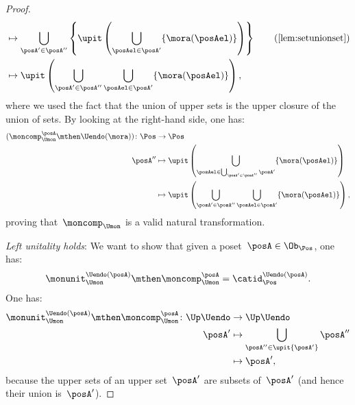 \begin{proof}
\begin{equation}
\begin{aligned}
			                                                                & \mapsto   \bigcup_{\posA'\in \posA''} \left\{ \upit \left( \bigcup_{\posAel \in \posA'} \{ \mora(\posAel)\}\right)\right\} \quad \quad (\text{\cref{lem:setunionset}})                           \\
			                                                                & \mapsto   \upit \left(\bigcup_{\posA'\in \posA''}  \bigcup_{\posAel \in \posA'} \{ \mora(\posAel)\}\right),
		\end{aligned}
	\end{equation}
	where we used the fact that the union of upper sets is the upper closure of the union of sets.
	By looking at the right-hand side, one has:
	\begin{equation}
		\begin{aligned}
			(\moncomp_{\Umon}^\posA \mthen \Uendo(\mora))
			\colon \Pos & \to \Pos                                                                                                \\
			\posA''     & \mapsto \upit \left( \bigcup_{\posAel \in \bigcup_{\posA'\in \posA''}\posA'} \{ \mora(\posAel)\}\right) \\
			            & \mapsto \upit \left( \bigcup_{\posA'\in \posA''}\bigcup_{\posAel \in \posA'}\{\mora(\posAel)\}\right),
		\end{aligned}
	\end{equation}
	proving that~$\moncomp_{\Umon}$ is a valid natural transformation.

	\emph{Left unitality holds}: We want to show that given a poset~$\posA\in \Ob_\Pos$, one has:
	\begin{equation}
		\monunit_{\Umon}^{\Uendo(\posA)}\mthen \moncomp_{\Umon}^{\posA}=\catid_{\Pos}^{\Uendo(\posA)}.
	\end{equation}
	One has:
	\begin{equation}
		\begin{aligned}
			\monunit_{\Umon}^{\Uendo(\posA)}\mthen \moncomp_{\Umon}^{\posA}\colon \Up \Uendo & \to \Up \Uendo                                         \\
			\posA'                                                                           & \mapsto \bigcup_{\posA''\in \upit \{ \posA'\}} \posA'' \\
			                                                                                 & \mapsto \posA',
		\end{aligned}
	\end{equation}
	because the upper sets of an upper set~$\posA'$ are subsets of~$\posA'$ (and hence their union is~$\posA'$).


\end{proof}
